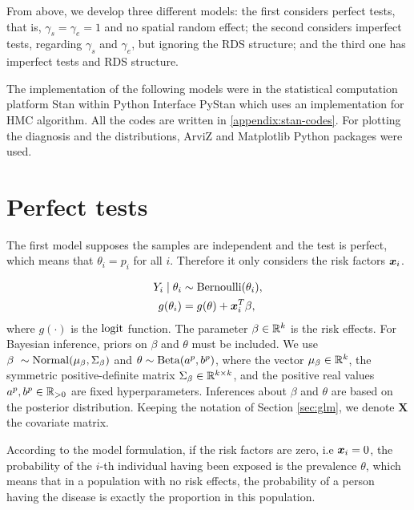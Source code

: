 From above, we develop three different models: the first considers perfect 
tests, that is, $\gamma_s = \gamma_e = 1$ and no spatial random effect; 
the second considers imperfect tests, regarding $\gamma_s$ and $\gamma_e$, 
but ignoring the RDS structure; and the third one has imperfect tests and 
RDS structure. 

The implementation of the following models were in the statistical computation
platform Stan \cite{carpenter2017stan} within Python Interface PyStan
\cite{pystan} which uses an implementation for HMC algorithm. All the codes
are written in \autoref{appendix:stan-codes}. For plotting the diagnosis and 
the distributions, ArviZ \cite{arviz_2019} and Matplotlib \cite{Hunter_2007}
Python packages were used. 

\section{Perfect tests}

The first model supposes the samples are independent and the test is perfect,
which means that $\theta_i = p_i$ for all $i$. Therefore it only considers the risk factors $\boldsymbol{x}_i$. 

\begin{equation}
  \label{model:perfect-tests}
  \begin{aligned}
    Y_i \mid \theta_i &\sim \operatorname{Bernoulli}(\theta_i), \\
    g(\theta_i) &= g(\theta) + \boldsymbol{x}_i^T\beta, 
  \end{aligned}  
\end{equation}
where $g(\cdot)$ is the $\operatorname{logit}$ function.
The parameter $\beta \in \mathbb{R}^{k}$ is the risk effects. For Bayesian inference, priors on
$\beta$ and $\theta$ must be included. We use $\beta ~ \sim \operatorname{Normal}(\mu_{\beta}, \Sigma_{\beta})$
and $\theta \sim \operatorname{Beta}(a^{p}, b^p)$, where the vector $\mu_{\beta}
\in \mathbb{R}^{k}$, the symmetric positive-definite matrix $\Sigma_{\beta} \in
\mathbb{R}^{k\times k}$, and the positive real values $a^p, b^p \in \mathbb{R}_{>0}$ are fixed
hyperparameters. Inferences about $\beta$ and $\theta$ are based on the
posterior distribution. Keeping the notation of
Section \ref{sec:glm}, we denote $\boldsymbol{X}$ the covariate matrix. 

\begin{remark}
  \label{remark:interpretation-prevalence}
  According to the model formulation, if the risk factors are zero, i.e $\boldsymbol{x}_i
  = 0$, the probability of the $i$-th individual having been exposed is the prevalence $\theta$, which means that in
a population with no risk effects, the probability of a person having the
disease is exactly the proportion in this population. 
\end{remark}

